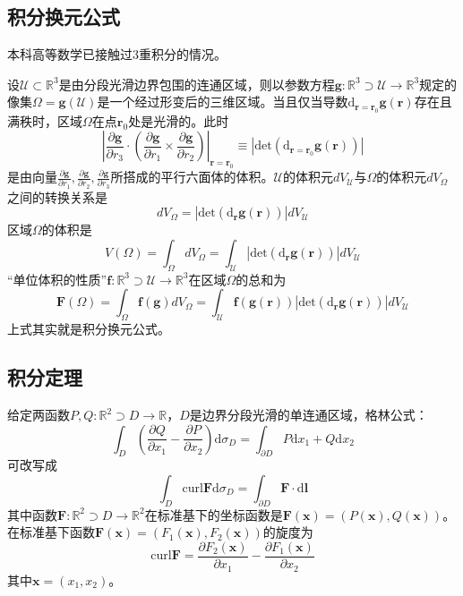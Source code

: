 \documentclass[../main.tex]{subfiles}
\begin{document}
\subsection{积分换元公式}
本科高等数学已接触过3重积分的情况\cite[\S 8.3“五”]{华工高数2009下}。

设$\mathcal{U}\subset\mathbb{R}^3$是由分段光滑边界包围的连通区域，则以参数方程$\mathbf{g}:\mathbb{R}^3\supset \mathcal{U}\rightarrow\mathbb{R}^3$规定的像集$\Omega=\mathbf{g}\left(\mathcal{U}\right)$是一个经过形变后的三维区域。当且仅当导数$\mathrm{d}_{\mathbf{r}=\mathbf{r}_0}\mathbf{g}\left(\mathbf{r}\right)$存在且满秩时，区域$\Omega$在点$\mathbf{r}_0$处是光滑的。此时
\[
    \left|\frac{\partial \mathbf{g}}{\partial r_3}\cdot\left(\frac{\partial\mathbf{g}}{\partial r_1}\times\frac{\partial\mathbf{g}}{\partial r_2}\right)\right|_{\mathbf{r}=\mathbf{r}_0}\equiv\left|\mathrm{det}\left(\mathrm{d}_{\mathbf{r}=\mathbf{r}_0}\mathbf{g}\left(\mathbf{r}\right)\right)\right|
\]
是由向量$\frac{\partial\mathbf{g}}{\partial r_1},\frac{\partial\mathbf{g}}{\partial r_2},\frac{\partial\mathbf{g}}{\partial r_3}$所搭成的平行六面体的体积。$\mathcal{U}$的体积元$dV_{\mathcal{U}}$与$\Omega$的体积元$dV_\Omega$之间的转换关系是
\[dV_\Omega=\left|\mathrm{det}\left(\mathrm{d}_{\mathbf{r}}\mathbf{g}\left(\mathbf{r}\right)\right)\right|
    dV_{\mathcal{U}}\]
区域$\Omega$的体积是
\[
    V\left(\Omega\right)=\int_\Omega dV_\Omega=\int_{\mathcal{U}}\left|\mathrm{det}\left(\mathrm{d}_{\mathbf{r}}\mathbf{g}\left(\mathbf{r}\right)\right)\right|dV_{\mathcal{U}}
\]
“单位体积的性质”$\mathbf{f}:\mathbb{R}^3\supset\mathcal{U}\rightarrow\mathbb{R}^3$在区域$\Omega$的总和为
\[
    \mathbf{F}\left(\Omega\right)=\int_\Omega\mathbf{f}\left(\mathbf{g}\right)dV_\Omega=\int_{\mathcal{U}}\mathbf{f}\left(\mathbf{g}\left(\mathbf{r}\right)\right)\left|\mathrm{det}\left(\mathrm{d}_{\mathbf{r}}\mathbf{g}\left(\mathbf{r}\right)\right)\right|dV_{\mathcal{U}}
\]
上式其实就是积分换元公式。

\subsection{积分定理}
给定两函数$P,Q:\mathbb{R}^2\supset D\rightarrow\mathbb{R}$，$D$是边界分段光滑的单连通区域，格林公式：
\[\int_D\left(\frac{\partial Q}{\partial x_1}-\frac{\partial P}{\partial x_2}\right)\mathrm{d}\sigma_D=\int_{\partial D}P\mathrm{d}x_1+Q\mathrm{d}x_2
\]
可改写成
\[
    \int_D\mathrm{curl}\mathbf{F}\mathrm{d}\sigma_D=\int_{\partial D}\mathbf{F}\cdot \mathrm{d}\mathbf{l}
\]
其中函数$\mathbf{F}:\mathbb{R}^2\supset D\rightarrow\mathbb{R}^2$在标准基下的坐标函数是$\mathbf{F}\left(\mathbf{x}\right)=\left(P\left(\mathbf{x}\right),Q\left(\mathbf{x}\right)\right)$。在标准基下函数$\mathbf{F}\left(\mathbf{x}\right)=\left(F_1\left(\mathbf{x}\right),F_2\left(\mathbf{x}\right)\right)$的旋度为
\[\mathrm{curl}\mathbf{F}=\frac{\partial F_2\left(\mathbf{x}\right)}{\partial x_1}-\frac{\partial F_1\left(\mathbf{x}\right)}{\partial x_2}\]
其中$\mathbf{x}=\left(x_1,x_2\right)$。
\end{document}
